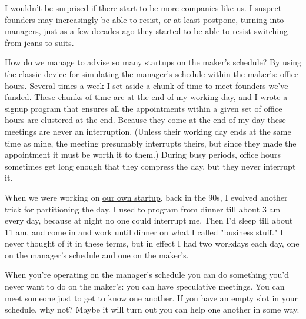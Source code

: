 I
                    wouldn't be surprised if there start to be more companies
                    like us. I suspect founders may increasingly be able to
                    resist, or at least postpone, turning into managers, just as
                    a few decades ago they started to be able to resist
                    switching from jeans to suits.

How do we manage
                    to advise so many startups on the maker's schedule? By using
                    the classic device for simulating the manager's schedule
                    within the maker's: office hours. Several times a week I set
                    aside a chunk of time to meet founders we've funded. These
                    chunks of time are at the end of my working day, and I wrote
                    a signup program that ensures all the appointments within a
                    given set of office hours are clustered at the end. Because
                    they come at the end of my day these meetings are never an
                    interruption. (Unless their working day ends at the same
                    time as mine, the meeting presumably interrupts theirs, but
                    since they made the appointment it must be worth it to
                    them.) During busy periods, office hours sometimes get long
                    enough that they compress the day, but they never interrupt
                    it.


                    When we were working on
                    \href{http://www.paulgraham.com/start.html}{our own startup}, back in the 90s, I evolved another trick for partitioning
                    the day. I used to program from dinner till about 3 am every
                    day, because at night no one could interrupt me. Then I'd
                    sleep till about 11 am, and come in and work until dinner on
                    what I called "business stuff." I never thought of it in
                    these terms, but in effect I had two workdays each day, one
                    on the manager's schedule and one on the maker's.

When
                    you're operating on the manager's schedule you can do
                    something you'd never want to do on the maker's: you can
                    have speculative meetings. You can meet someone just to get
                    to know one another. If you have an empty slot in your
                    schedule, why not? Maybe it will turn out you can help one
                    another in some way.


